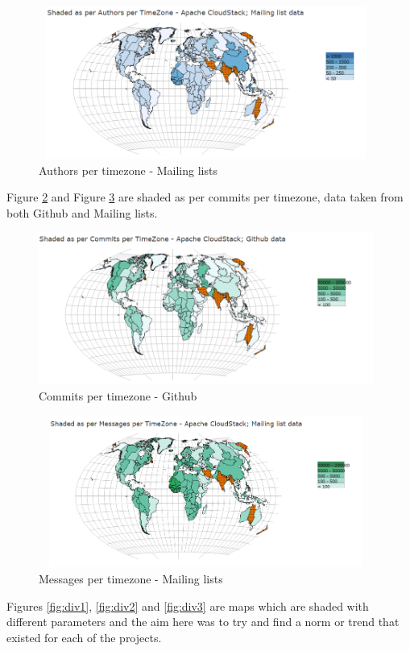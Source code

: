 \documentclass[seploa]{beavtex}
\begin{document}
\begin{figure}[H]
\centering
\includegraphics[width=110mm,height=50mm]{image5.PNG}
\caption{Authors per timezone - Mailing lists}
\label{fig:auML}
\end{figure}

Figure \ref{fig:coHub} and Figure \ref{fig:mgML} are shaded as per commits per timezone, data taken from both Github and Mailing lists.

\begin{figure}[H]
\centering
\includegraphics[width=110mm,height=50mm]{image6.PNG}
\caption{Commits per timezone - Github}
\label{fig:coHub}
\end{figure}

\begin{figure}[H]
\centering
\includegraphics[width=110mm,height=50mm]{image7.PNG}
\caption{Messages per timezone - Mailing lists}
\label{fig:mgML}
\end{figure}

Figures \ref{fig:div1}, \ref{fig:div2} and \ref{fig:div3} are maps which are shaded with different parameters and the aim here was to try and find a norm or trend that existed for each of the projects.
\end{document}
